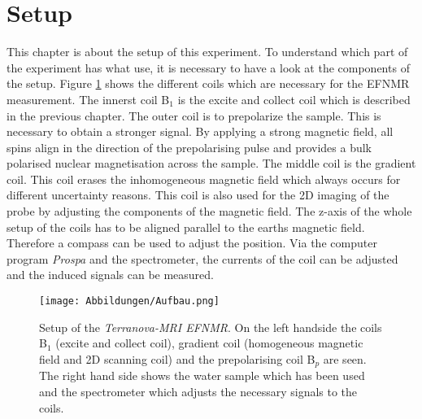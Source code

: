 \section{Setup}
\label{sec:Aufbau}
This chapter is about the setup of this experiment. To understand which part of the experiment has what use, it is necessary to have a look at the components of the setup.\newline
Figure \ref{fig:Aufbau} shows the different coils which are necessary for the EFNMR measurement. The innerst coil B$_1$ is the excite and collect coil which is described in the previous chapter. The outer coil is to prepolarize the sample. This is necessary to obtain a stronger signal. By applying a strong magnetic field, all spins align in the direction of the prepolarising pulse and provides a bulk polarised nuclear magnetisation across the sample. The middle coil is the gradient coil. This coil erases the inhomogeneous magnetic field which always occurs for different uncertainty reasons. This coil is also used for the 2D imaging of the probe by adjusting the components of the magnetic field. The z-axis of the whole setup of the coils has to be aligned parallel to the earths magnetic field. Therefore a compass can be used to adjust the position. Via the computer program \textit{Prospa} and the spectrometer, the currents of the coil can be adjusted and the induced signals can be measured.
\begin{figure}[H]
    \centering
    \texttt{[image: Abbildungen/Aufbau.png]}   
    \caption[Setup of the \textit{Terranova-MRI EFNMR}. \cite{Bild}]{Setup of the \textit{Terranova-MRI EFNMR}. On the left handside the coils B$_1$ (excite and collect coil), gradient coil (homogeneous magnetic field and 2D scanning coil) and the prepolarising coil B$_p$ are seen. The right hand side shows the water sample which has been used and the spectrometer which adjusts the necessary signals to the coils. \cite{Bild}}
    \label{fig:Aufbau}
\end{figure}
